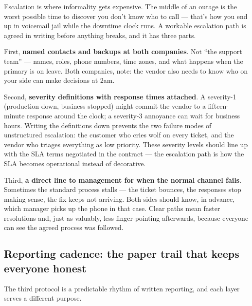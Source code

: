 Escalation is where informality gets expensive. The middle of an outage is the worst possible time to discover you don't know who to call — that's how you end up in voicemail jail while the downtime clock runs. A workable escalation path is agreed in writing before anything breaks, and it has three parts.


First, \textbf{named contacts and backups at both companies}. Not ``the support team'' — names, roles, phone numbers, time zones, and what happens when the primary is on leave. Both companies, note: the vendor also needs to know who on your side can make decisions at 2am.


Second, \textbf{severity definitions with response times attached}. A severity-1 (production down, business stopped) might commit the vendor to a fifteen-minute response around the clock; a severity-3 annoyance can wait for business hours. Writing the definitions down prevents the two failure modes of unstructured escalation: the customer who cries wolf on every ticket, and the vendor who triages everything as low priority. These severity levels should line up with the SLA terms negotiated in the contract — the escalation path is how the SLA becomes operational instead of decorative.


Third, \textbf{a direct line to management for when the normal channel fails}. Sometimes the standard process stalls — the ticket bounces, the responses stop making sense, the fix keeps not arriving. Both sides should know, in advance, which manager picks up the phone in that case. Clear paths mean faster resolutions and, just as valuably, less finger-pointing afterwards, because everyone can see the agreed process was followed.



\subsection{Reporting cadence: the paper trail that keeps everyone honest}


The third protocol is a predictable rhythm of written reporting, and each layer serves a different purpose.


